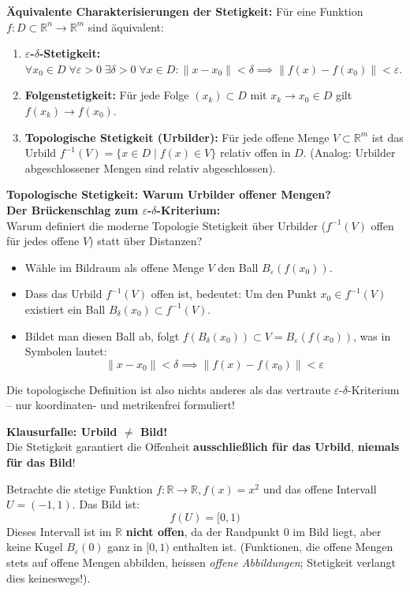 \begin{theorem}
    \textbf{Äquivalente Charakterisierungen der Stetigkeit:}
    Für eine Funktion $f: D \subset \mathbb{R}^n \to \mathbb{R}^m$ sind äquivalent:
    \begin{enumerate}
        \item \textbf{$\varepsilon$-$\delta$-Stetigkeit:} $\forall x_0 \in D \; \forall \varepsilon > 0 \; \exists \delta > 0 \; \forall x \in D: \|x - x_0\| < \delta \implies \|f(x) - f(x_0)\| < \varepsilon$.
        \item \textbf{Folgenstetigkeit:} Für jede Folge $(x_k) \subset D$ mit $x_k \to x_0 \in D$ gilt $f(x_k) \to f(x_0)$.
        \item \textbf{Topologische Stetigkeit (Urbilder):} Für jede offene Menge $V \subset \mathbb{R}^m$ ist das Urbild $f^{-1}(V) = \{x \in D \mid f(x) \in V\}$ relativ offen in $D$. (Analog: Urbilder abgeschlossener Mengen sind relativ abgeschlossen).
    \end{enumerate}
\end{theorem}

\begin{remark}
    \textbf{Topologische Stetigkeit: Warum Urbilder offener Mengen?} \\
    \textbf{Der Brückenschlag zum $\varepsilon$-$\delta$-Kriterium:} \\
    Warum definiert die moderne Topologie Stetigkeit über Urbilder ($f^{-1}(V)$ offen für jedes offene $V$) statt über Distanzen?
    \begin{itemize}
        \item Wähle im Bildraum als offene Menge $V$ den Ball $B_\varepsilon(f(x_0))$.
        \item Dass das Urbild $f^{-1}(V)$ offen ist, bedeutet: Um den Punkt $x_0 \in f^{-1}(V)$ existiert ein Ball $B_\delta(x_0) \subset f^{-1}(V)$.
        \item Bildet man diesen Ball ab, folgt $f(B_\delta(x_0)) \subset V = B_\varepsilon(f(x_0))$, was in Symbolen lautet:
        $$ \|x - x_0\| < \delta \implies \|f(x) - f(x_0)\| < \varepsilon $$
    \end{itemize}
    Die topologische Definition ist also nichts anderes als das vertraute $\varepsilon$-$\delta$-Kriterium – nur koordinaten- und metrikenfrei formuliert!
\end{remark}

\begin{example}
    \textbf{Klausurfalle: Urbild $\neq$ Bild!} \\
    Die Stetigkeit garantiert die Offenheit \textbf{ausschließlich für das Urbild}, \textbf{niemals für das Bild}!
    
    Betrachte die stetige Funktion $f: \mathbb{R} \to \mathbb{R}, f(x) = x^2$ und das offene Intervall $U = (-1, 1)$.
    Das Bild ist:
    $$ f(U) = [0, 1) $$
    Dieses Intervall ist im $\mathbb{R}$ \textbf{nicht offen}, da der Randpunkt $0$ im Bild liegt, aber keine Kugel $B_\varepsilon(0)$ ganz in $[0, 1)$ enthalten ist. (Funktionen, die offene Mengen stets auf offene Mengen abbilden, heissen \textit{offene Abbildungen}; Stetigkeit verlangt dies keineswegs!).
\end{example}

